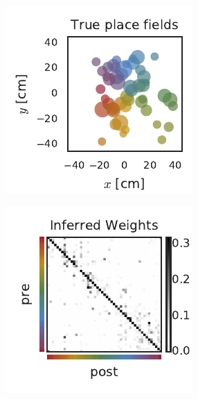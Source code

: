 \begin{figure}[t!]
  \begin{center}
    \begin{subfigure}[T]{1.8in}
      \caption{}
      \vspace{-2em}
      \includegraphics[width=\textwidth]{figures/ch3/hipp_colored_locations} 
      \label{fig:hipp_colored_locations}
    \end{subfigure}
    \begin{subfigure}[T]{1.8in}
      \caption{}
      \vspace{-2em}
      \includegraphics[width=\textwidth]{figures/ch3/hipp_W} 

\end{subfigure}
\end{center}
\end{figure}
